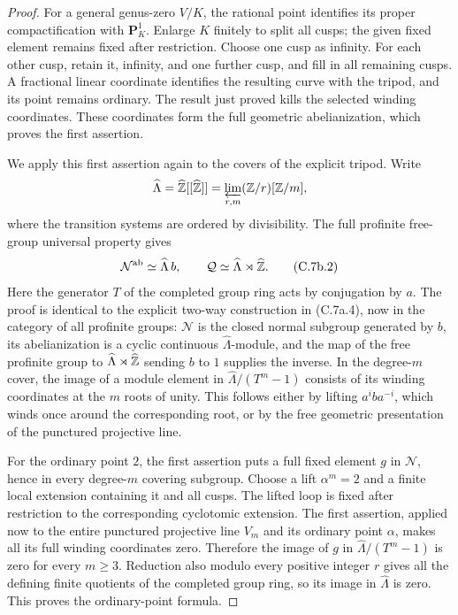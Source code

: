 \begin{proof}
For a general genus-zero $V/K$, the rational point identifies its proper
compactification with $\mathbf P^1_K$. Enlarge $K$ finitely to split
all cusps; the given fixed element remains fixed after restriction.
Choose one cusp as infinity. For each other cusp, retain it, infinity,
and one further cusp, and fill in all remaining cusps. A fractional linear
coordinate identifies the resulting curve with the tripod, and its point
remains ordinary. The result just proved kills the selected winding
coordinates. These coordinates form the full geometric abelianization,
which proves the first assertion.

We apply this first assertion again to the covers of the explicit
tripod. Write
\[
 \widehat\Lambda=\widehat{\mathbb Z}[[\widehat{\mathbb Z}]]
   =\varprojlim_{r,m}(\mathbb Z/r)[\mathbb Z/m],
\]
where the transition systems are ordered by divisibility. The full
profinite free-group universal property gives
\[
 \mathcal N^{\rm ab}\simeq\widehat\Lambda\,b,\qquad
 \mathcal Q\simeq\widehat\Lambda\rtimes\widehat{\mathbb Z}.            \tag{C.7b.2}
\]
Here the generator $T$ of the completed group ring acts by conjugation
by $a$. The proof is identical to the explicit two-way construction in
(C.7a.4), now in the category of all profinite groups: $\mathcal N$ is
the closed normal subgroup generated by $b$, its abelianization is a
cyclic continuous $\widehat\Lambda$-module, and the map of the free
profinite group to $\widehat\Lambda\rtimes\widehat{\mathbb Z}$ sending $b$ to
$1$ supplies the inverse. In the degree-$m$ cover, the image of a module
element in $\widehat\Lambda/(T^m-1)$ consists of its winding coordinates
at the $m$ roots of unity. This follows either by lifting $a^i b a^{-i}$,
which winds once around the corresponding root, or by the free geometric
presentation of the punctured projective line.

For the ordinary point $2$, the first assertion puts a full fixed element
$g$ in $\mathcal N$, hence in every degree-$m$ covering subgroup. Choose
a lift $\alpha^m=2$ and a finite local extension containing it and all
cusps. The lifted loop is fixed after restriction to the corresponding
cyclotomic extension. The first assertion, applied now to the entire
punctured projective line $V_m$ and its ordinary point $\alpha$, makes
all its full winding coordinates zero. Therefore the image of $g$ in
$\widehat\Lambda/(T^m-1)$ is zero for every $m\ge3$. Reduction also
modulo every positive integer $r$ gives all the defining finite quotients
of the completed group ring, so its image in $\widehat\Lambda$ is zero.
This proves the ordinary-point formula.


\end{proof}
